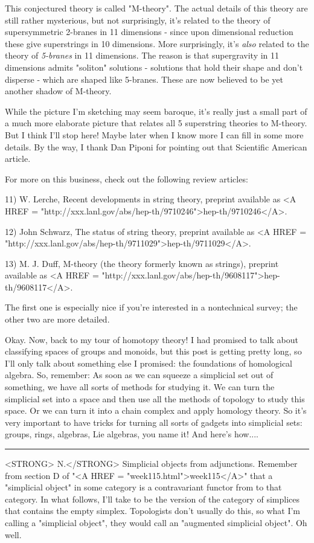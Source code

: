 This conjectured theory is called "M-theory".  The actual details of
this theory are still rather mysterious, but not surprisingly, it's
related to the theory of supersymmetric 2-branes in 11 dimensions -
since upon dimensional reduction these give superstrings in 10
dimensions.  More surprisingly, it's \emph{also} related to the theory of
\emph{5-branes} in 11 dimensions.  The reason is that supergravity in 11
dimensions admits "soliton" solutions - solutions that hold their shape
and don't disperse - which are shaped like 5-branes.  These are now
believed to be yet another shadow of M-theory.

While the picture I'm sketching may seem baroque, it's really just a
small part of a much more elaborate picture that relates all 5
superstring theories to M-theory.  But I think I'll stop here!  Maybe
later when I know more I can fill in some more details.  By the way, I
thank Dan Piponi for pointing out that Scientific American article.  

For more on this business, check out the following review articles:

11) W. Lerche, Recent developments in string theory, preprint available
as <A HREF = "http://xxx.lanl.gov/abs/hep-th/9710246">hep-th/9710246</A>.  

12) John Schwarz, The status of string theory, preprint available as
<A HREF = "http://xxx.lanl.gov/abs/hep-th/9711029">hep-th/9711029</A>.  

13) M. J. Duff, M-theory (the theory formerly known as strings),
preprint available as <A HREF = "http://xxx.lanl.gov/abs/hep-th/9608117">hep-th/9608117</A>.

The first one is especially nice if you're interested in a nontechnical
survey; the other two are more detailed.

Okay.  Now, back to my tour of homotopy theory!  I had promised to talk
about classifying spaces of groups and monoids, but this post is getting
pretty long, so I'll only talk about something else I promised: the
foundations of homological algebra.  So, remember:
As soon as we can squeeze a simplicial set out of something, we have all
sorts of methods for studying it.  We can turn the simplicial set into a
space and then use all the methods of topology to study this space.  Or
we can turn it into a chain complex and apply homology theory.  So it's
very important to have tricks for turning all sorts of gadgets into
simplicial sets: groups, rings, algebras, Lie algebras, you name it!
And here's how....
\par\noindent\rule{\textwidth}{0.4pt}
<STRONG> N.</STRONG>  Simplicial objects from adjunctions.  Remember from section D of
"<A HREF = "week115.html">week115</A>" that a "simplicial object" in some category is a contravariant
functor from \Delta  to that category.  In what follows, I'll take \Delta 
to be the version of the category of simplices that contains the empty
simplex.  Topologists don't usually do this, so what I'm calling a
"simplicial object", they would call an "augmented simplicial object".
Oh well.

